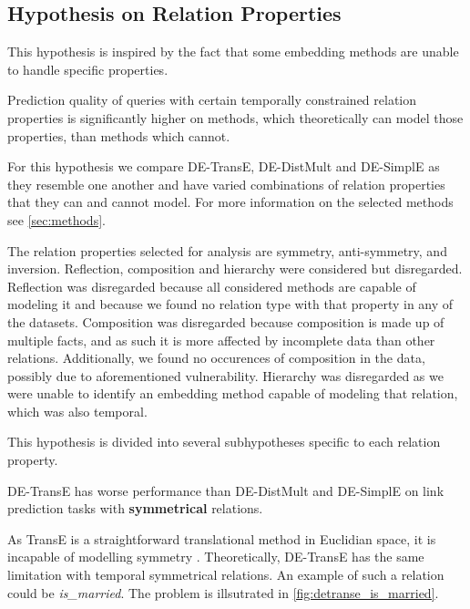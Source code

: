 \subsection{Hypothesis on Relation Properties}
\label{sec:hypothesis_relation_properties}

This hypothesis is inspired by the fact that some embedding methods are unable to handle specific properties.

%
%

\begin{hypothesis}
\label{hyp:relation_properties}
Prediction quality of queries with certain temporally constrained relation properties is significantly higher on methods, which theoretically can model those properties, than methods which cannot.
\end{hypothesis}

For this hypothesis we compare DE-TransE, DE-DistMult and DE-SimplE as they resemble one another and have varied combinations of relation properties that they can and cannot model.
For more information on the selected methods see \autoref{sec:methods}.

The relation properties selected for analysis are symmetry, anti-symmetry, and inversion. Reflection, composition and hierarchy were considered but disregarded. 
Reflection was disregarded because all considered methods are capable of modeling it and because we found no relation type with that property in any of the datasets.
Composition was disregarded because composition is made up of multiple facts, and as such it is more affected by incomplete data than other relations. Additionally, we found no occurences of composition in the data, possibly due to aforementioned vulnerability.
Hierarchy was disregarded as we were unable to identify an embedding method capable of modeling that relation, which was also temporal.

This hypothesis is divided into several subhypotheses specific to each relation property.

\begin{subhypothesis}
\label{hyp:relation_property_sym}
DE-TransE has worse performance than DE-DistMult and DE-SimplE on link prediction tasks with \textbf{symmetrical} relations.
\end{subhypothesis}

As TransE is a straightforward translational method in Euclidian space, it is incapable of modelling symmetry \cite{goel19diachronicemb}. Theoretically, DE-TransE has the same limitation with temporal symmetrical relations.
An example of such a relation could be \textit{is\_married}. The problem is illsutrated in \autoref{fig:detranse_is_married}. 

